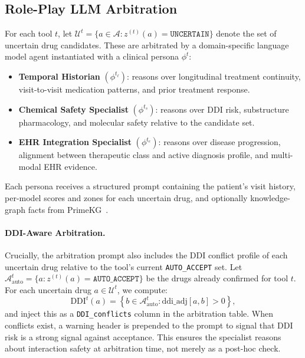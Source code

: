 \documentclass[sigconf,anonymous]{acmart}
\begin{document}
\subsection{Role-Play LLM Arbitration}

For each tool $t$, let $\mathcal{U}^t = \{a \in \mathcal{A} : z^{(t)}(a) = \texttt{UNCERTAIN}\}$ denote the set of uncertain drug candidates. These are arbitrated by a domain-specific language model agent instantiated with a clinical persona $\phi^t$:

\begin{itemize}
  \item \textbf{Temporal Historian} $(\phi^{t_\ell})$: reasons over longitudinal treatment continuity, visit-to-visit medication patterns, and prior treatment response.
  \item \textbf{Chemical Safety Specialist} $(\phi^{t_s})$: reasons over DDI risk, substructure pharmacology, and molecular safety relative to the candidate set.
  \item \textbf{EHR Integration Specialist} $(\phi^{t_e})$: reasons over disease progression, alignment between therapeutic class and active diagnosis profile, and multi-modal EHR evidence.
\end{itemize}

Each persona receives a structured prompt containing the patient's visit history, per-model scores and zones for each uncertain drug, and optionally knowledge-graph facts from PrimeKG~\cite{primekg}.

\paragraph{DDI-Aware Arbitration.}
Crucially, the arbitration prompt also includes the DDI conflict profile of each uncertain drug relative to the tool's current \texttt{AUTO\_ACCEPT} set. Let $\mathcal{A}^t_{\text{auto}} = \{a : z^{(t)}(a) = \texttt{AUTO\_ACCEPT}\}$ be the drugs already confirmed for tool $t$. For each uncertain drug $a \in \mathcal{U}^t$, we compute:
\begin{equation}
\text{DDI}^t(a) = \left\{ b \in \mathcal{A}^t_{\text{auto}} : \text{ddi\_adj}[a, b] > 0 \right\},
\end{equation}
and inject this as a \texttt{DDI\_conflicts} column in the arbitration table. When conflicts exist, a warning header is prepended to the prompt to signal that DDI risk is a strong signal against acceptance. This ensures the specialist reasons about interaction safety at arbitration time, not merely as a post-hoc check.
\end{document}
